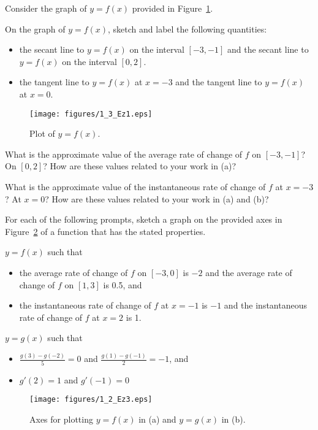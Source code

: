 \begin{exercises} 
\item Consider the graph of $y = f(x)$ provided in Figure~\ref{F:1.3.Ez1}.
	\ba
		\item On the graph of $y = f(x)$, sketch and label the following quantities:
		\begin{itemize}
			\item the secant line to $y = f(x)$ on the interval $[-3,-1]$ and the secant line to $y = f(x)$ on the interval $[0,2]$.
			\item the tangent line to $y = f(x)$ at $x = -3$ and the tangent line to $y = f(x)$ at $x = 0$.
		\end{itemize}
\begin{figure}[h]
  \begin{center}
 \texttt{[image: figures/1\_3\_Ez1.eps]}    \end{center}
   \caption{Plot of $y = f(x)$.} \label{F:1.3.Ez1}
\end{figure}
		\item What is the approximate value of the average rate of change of $f$ on $[-3,-1]$?  On $[0,2]$?  How are these values related to your work in (a)?
		\item What is the approximate value of the instantaneous rate of change of $f$ at $x = -3$?  At $x = 0$?  How are these values related to your work in (a) and (b)?

	\ea	
	
\begin{exerciseSolution}
\end{exerciseSolution}
\item For each of the following prompts, sketch a graph on the provided axes in Figure~\ref{F:1.3.Ez2} of a function that has the stated properties.
  \ba
  	\item $y = f(x)$ such that 
	\begin{itemize}
		\item the average rate of change of $f$ on $[-3,0]$ is $-2$ and the average rate of change of $f$ on $[1,3]$ is 0.5, and
		\item the instantaneous rate of change of $f$ at $x = -1$ is $-1$ and the instantaneous rate of change of $f$ at $x = 2$ is 1. 
	\end{itemize}
	\item $y = g(x)$ such that
	\begin{itemize}
		\item $\frac{g(3)-g(-2)}{5} = 0$ and $\frac{g(1)-g(-1)}{2} = -1$, and
		\item $g'(2) = 1$ and $g'(-1) = 0$
	\end{itemize}
\begin{figure}[h]
  \begin{center}
 \texttt{[image: figures/1\_2\_Ez3.eps]} %
   \end{center}
   \caption{Axes for plotting $y = f(x)$ in (a) and $y = g(x)$ in (b).} \label{F:1.3.Ez2}
\end{figure}
  \ea


\end{exercises}
